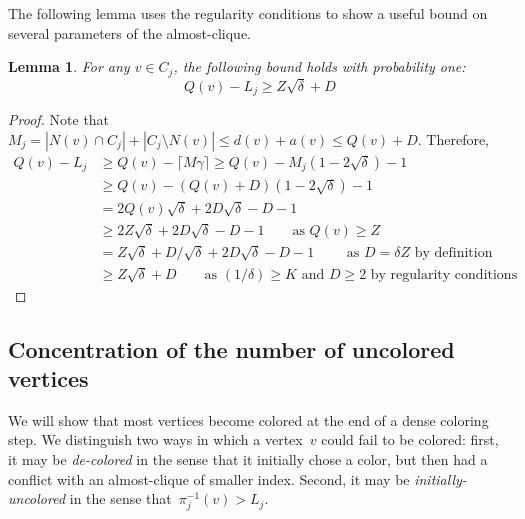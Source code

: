 \documentclass[11pt]{amsart}
\newtheorem{lemma}[theorem]{Lemma}
\begin{document}
The following lemma uses the regularity conditions to show a useful bound on several parameters of the almost-clique.
\begin{lemma}
\label{aprop1}
For any $v \in C_j$, the following bound holds with probability one:
$$
Q(v) - L_j \geq Z \sqrt{\delta} + D
$$
\end{lemma}
\begin{proof}
Note that $M _j = |N(v) \cap C_j| + |C_j \setminus N(v)| \leq d(v) + a(v) \leq Q(v) + D$. Therefore,
{\allowdisplaybreaks
\begin{align*}
Q(v) - L_j &\geq Q(v) - \lceil M \gamma \rceil \geq Q(v) -  M_j (1 - 2 \sqrt{\delta})- 1 \\
&\geq Q(v) -  (Q(v)+D)(1 - 2 \sqrt{\delta})  - 1 \\
&= 2 Q(v) \sqrt{\delta} + 2 D \sqrt{\delta} - D - 1 \\
&\geq 2 Z \sqrt{\delta} + 2 D \sqrt{\delta} - D - 1 \qquad \text{as $Q(v) \geq Z$}  \\
&=Z \sqrt{\delta}  + D/\sqrt{\delta} + 2 D \sqrt{\delta} - D - 1 \qquad \text{ as $D = \delta Z$ by definition} \\
&\geq Z \sqrt{\delta}+ D \qquad \text{as $(1/\delta) \geq K$ and $D \geq 2$ by regularity conditions}
\end{align*}
}
\end{proof}


\subsection{Concentration of the number of uncolored vertices}
We will show that most vertices become colored at the end of a dense coloring step. We distinguish two ways in which a vertex~$v$ could fail to be colored: first, it may be \emph{de-colored} in the sense that it initially chose a color, but then had a conflict with an almost-clique of smaller index. Second, it may be \emph{initially-uncolored} in the sense that~$\pi_j^{-1} (v) > L_j$.
\end{document}
